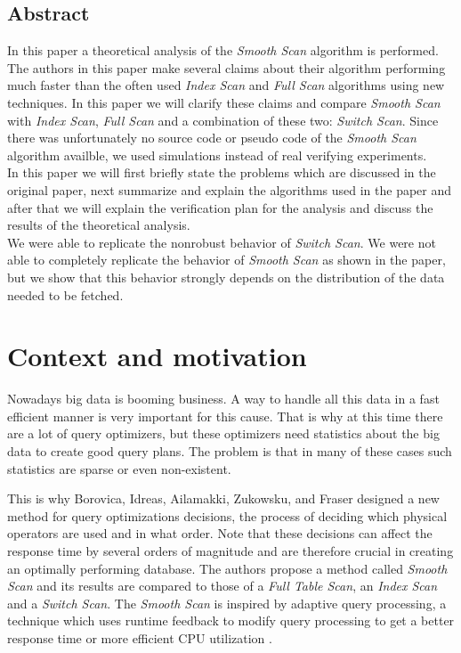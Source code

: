 \documentclass[a4paper,11pt,twoside]{article}
\begin{document}
    \newpage
\begin{center}\section*{Abstract}\end{center}
In this paper a theoretical analysis of the \textit{Smooth Scan} algorithm \cite{smoothscan} is performed. The authors in this paper make several claims about their algorithm performing much faster than the often used \textit{Index Scan} and \textit{Full Scan} algorithms using new techniques. In this paper we will clarify these claims and compare \textit{Smooth Scan} with \textit{Index Scan}, \textit{Full Scan} and a combination of these two: \textit{Switch Scan}. Since there was unfortunately no source code or pseudo code of the \textit{Smooth Scan} algorithm availble, we used simulations instead of real verifying experiments. \\
In this paper we will first briefly state the problems which are discussed in the original paper, next summarize and explain the algorithms used in the paper and after that we will explain the verification plan for the analysis and discuss the results of the theoretical analysis.\\
We were able to replicate the nonrobust behavior of \textit{Switch Scan}. We were not able to completely replicate the behavior of \textit{Smooth Scan} as shown in the paper, but we show that this behavior strongly depends on the distribution of the data needed to be fetched.

\newpage
\section{Context and motivation}
Nowadays big data is booming business. A way to handle all this data in a fast efficient manner is very important for this cause. That is why at this time there are a lot of query optimizers, but these optimizers need statistics about the big data to create good query plans. The problem is that in many of these cases such statistics are sparse or even non-existent.

This is why Borovica, Idreas, Ailamakki, Zukowsku, and Fraser \cite{smoothscan} designed a new method for query optimizations decisions, the process of deciding which physical operators are used and in what order. Note that these decisions can affect the response time by several orders of magnitude and are therefore crucial in creating an optimally performing database. The authors propose a method called \emph{Smooth Scan} and its results are compared to those of a \emph{Full Table Scan}, an \emph{Index Scan} and a \emph{Switch Scan}. The \emph{Smooth Scan} is inspired by adaptive query processing, a technique which uses runtime feedback to modify query processing to get a better response time or more efficient CPU utilization \cite{query}.
\end{document}
